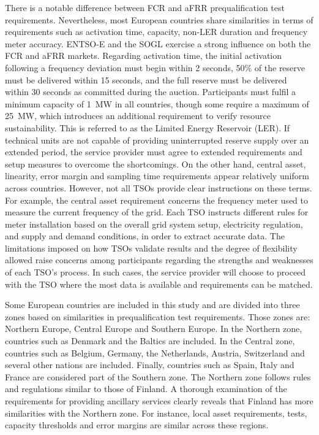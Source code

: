 There is a notable difference between FCR and aFRR prequalification test requirements. Nevertheless, most European countries share similarities in terms of requirements such as activation time, capacity, non-LER duration and frequency meter accuracy. ENTSO-E and the SOGL exercise a strong influence on both the FCR and aFRR markets. Regarding activation time, the initial activation following a frequency deviation must begin within 2 seconds, 50\% of the reserve must be delivered within 15 seconds, and the full reserve must be delivered within 30 seconds as committed during the auction. Participants must fulfil a minimum capacity of 1~MW in all countries, though some require a maximum of 25~MW, which introduces an additional requirement to verify resource sustainability. This is referred to as the Limited Energy Reservoir (LER). If technical units are not capable of providing uninterrupted reserve supply over an extended period, the service provider must agree to extended requirements and setup measures to overcome the shortcomings. On the other hand, central asset, linearity, error margin and sampling time requirements appear relatively uniform across countries. However, not all TSOs provide clear instructions on these terms. For example, the central asset requirement concerns the frequency meter used to measure the current frequency of the grid. Each TSO instructs different rules for meter installation based on the overall grid system setup, electricity regulation, and supply and demand conditions, in order to extract accurate data. The limitations imposed on how TSOs validate results and the degree of flexibility allowed raise concerns among participants regarding the strengths and weaknesses of each TSO's process. In such cases, the service provider will choose to proceed with the TSO where the most data is available and requirements can be matched.


Some European countries are included in this study and are divided into three zones based on similarities in prequalification test requirements. Those zones are: Northern Europe, Central Europe and Southern Europe. In the Northern zone, countries such as Denmark and the Baltics are included. In the Central zone, countries such as Belgium, Germany, the Netherlands, Austria, Switzerland and several other nations are included. Finally, countries such as Spain, Italy and France are considered part of the Southern zone. The Northern zone follows rules and regulations similar to those of Finland. A thorough examination of the requirements for providing ancillary services clearly reveals that Finland has more similarities with the Northern zone. For instance, local asset requirements, tests, capacity thresholds and error margins are similar across these regions.



